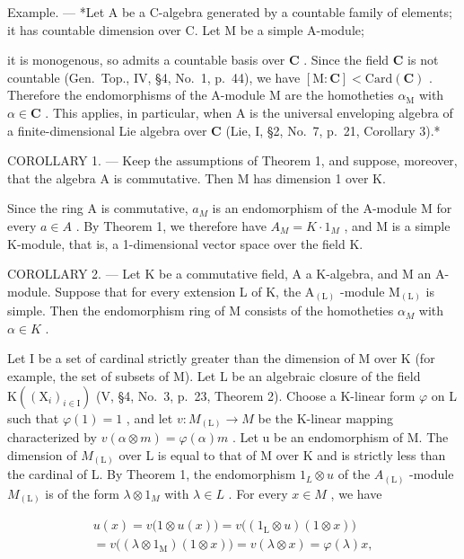 Example. --- *Let A be a C-algebra generated by a countable family of elements; it has countable dimension over C. Let M be a simple A-module;

it is monogenous, so admits a countable basis over \(\mathbf{C}\) . Since the field \(\mathbf{C}\) is not countable (Gen.~Top., IV, §4, No.~1, p.~44), we have \([\mathrm{M}:\mathbf{C}] < \mathrm{Card}(\mathbf{C})\) . Therefore the endomorphisms of the A-module M are the homotheties \(\alpha_{\mathrm{M}}\) with \(\alpha \in \mathbf{C}\) . This applies, in particular, when A is the universal enveloping algebra of a finite-dimensional Lie algebra over \(\mathbf{C}\) (Lie, I, §2, No.~7, p.~21, Corollary 3).*

COROLLARY 1. --- Keep the assumptions of Theorem 1, and suppose, moreover, that the algebra A is commutative. Then M has dimension 1 over K.

Since the ring A is commutative, \(a_{M}\) is an endomorphism of the A-module M for every \(a \in A\) . By Theorem 1, we therefore have \(A_{M} = K \cdot 1_{M}\) , and M is a simple K-module, that is, a 1-dimensional vector space over the field K.

COROLLARY 2. --- Let K be a commutative field, A a K-algebra, and M an A-module. Suppose that for every extension L of K, the \(\mathrm{A}_{(\mathrm{L})}\) -module \(\mathrm{M}_{(\mathrm{L})}\) is simple. Then the endomorphism ring of M consists of the homotheties \(\alpha_{M}\) with \(\alpha \in K\) .

Let I be a set of cardinal strictly greater than the dimension of M over K (for example, the set of subsets of M). Let L be an algebraic closure of the field \(\mathrm{K}((\mathrm{X}_{i})_{i\in\mathrm{I}})\) (V, §4, No.~3, p.~23, Theorem 2). Choose a K-linear form \(\varphi\) on L such that \(\varphi(1)=1\) , and let \(v:M_{(\mathrm{L})}\to M\) be the K-linear mapping characterized by \(v(\alpha\otimes m)=\varphi(\alpha)m\) . Let u be an endomorphism of M. The dimension of \(M_{(\mathrm{L})}\) over L is equal to that of M over K and is strictly less than the cardinal of L. By Theorem 1, the endomorphism \(1_{L}\otimes u\) of the \(A_{(\mathrm{L})}\) -module \(M_{(\mathrm{L})}\) is of the form \(\lambda\otimes1_{M}\) with \(\lambda\in L\) . For every \(x\in M\) , we have

\[
\begin{array}{c} u (x) = v \bigl (1 \otimes u (x) \bigr) = v \bigl ((1 _ {\mathrm{L}} \otimes u) (1 \otimes x) \bigr) \\ = v \bigl ((\lambda \otimes 1 _ {\mathrm{M}}) (1 \otimes x) \bigr) = v (\lambda \otimes x) = \varphi (\lambda) x, \end{array}
\]

